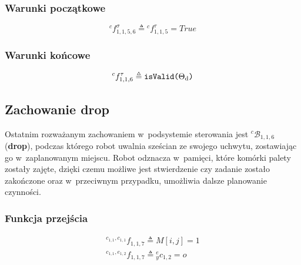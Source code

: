 \subsubsection{Warunki początkowe}
\begin{equation}
    {}^{c}f^{\sigma}_{1,1,5,6} \triangleq {}^{c}f^{\tau}_{1,1,5} = True
\end{equation}

\subsubsection{Warunki końcowe}
\begin{equation}
    {}^{c}f^{\tau}_{1,1,6} \triangleq \text{\texttt{isValid($\Theta_{\mathrm{d}}$)}}
\end{equation}


\subsection{Zachowanie drop}
\label{subsec:cs-drop}
Ostatnim rozważanym zachowaniem w~podsystemie sterowania jest ${}^{c}\mathcal{B}_{1,1,6}$ (\textbf{drop}), podczas którego robot uwalnia sześcian ze swojego uchwytu, zostawiając go w~zaplanowanym miejscu. Robot odznacza w~pamięci, które komórki palety zostały zajęte, dzięki czemu możliwe jest stwierdzenie czy zadanie zostało zakończone oraz w~przeciwnym przypadku, umożliwia dalsze planowanie czynności.

\subsubsection{Funkcja przejścia}
\begin{equation}
    \begin{gathered}
        {}^{c_{1,1}, c_{1,1}}f_{1,1,7} \triangleq M[i,j] = 1 \\
        {}^{c_{1,1}, e_{1,2}}f_{1,1,7} \triangleq {}^{e}_{y}c_{1,2} = o
    \end{gathered}
\end{equation}

